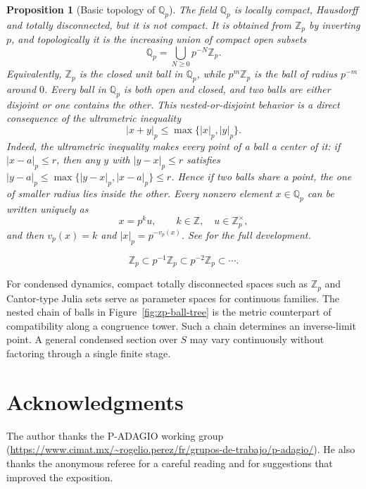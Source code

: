 \documentclass[10pt]{amsart}
\newcommand{\Z}{\mathbb{Z}}
\newcommand{\Zp}{\mathbb{Z}_p}
\newcommand{\Qp}{\mathbb{Q}_p}
\theoremstyle{plain}
\newtheorem{proposition}[theorem]{Proposition}
\theoremstyle{definition}
\begin{document}
\begin{proposition}[Basic topology of $\Qp$]
\label{prop:basic-topology-q-p}
The field $\Qp$ is locally compact, Hausdorff and totally disconnected, but it
is not compact. It is obtained from $\Zp$ by inverting $p$, and topologically it
is the increasing union of compact open subsets
\[
  \Qp=\bigcup_{N\ge0}p^{-N}\Zp.
\]
Equivalently, $\Zp$ is the closed unit ball in $\Qp$, while $p^m\Zp$ is the
ball of radius $p^{-m}$ around $0$. Every ball in $\Qp$ is both open and
closed, and two balls are either disjoint or one contains the other. This
nested-or-disjoint behavior is a direct consequence of the ultrametric
inequality
\[
  |x+y|_p\le \max\{|x|_p,|y|_p\}.
\]
Indeed, the ultrametric inequality makes every point of a ball a center of it:
if $|x-a|_p\le r$, then any $y$ with $|y-x|_p\le r$ satisfies
$|y-a|_p\le\max\{|y-x|_p,|x-a|_p\}\le r$. Hence if two balls share a point, the
one of smaller radius lies inside the other. Every nonzero element $x\in\Qp$
can be written uniquely as
\[
  x=p^k u,\qquad k\in\Z,\quad u\in\Zp^\times,
\]
and then $v_p(x)=k$ and $|x|_p=p^{-v_p(x)}$. See \cite{GouveaPadic} for the
full development.
\end{proposition}

\[
  \Zp\subset p^{-1}\Zp\subset p^{-2}\Zp\subset\cdots.
\]

For condensed dynamics, compact totally disconnected spaces such as $\Zp$ and
Cantor-type Julia sets serve as parameter spaces for continuous families. The
nested chain of balls in Figure~\ref{fig:zp-ball-tree} is the metric counterpart
of compatibility along a congruence tower. Such a chain determines an
inverse-limit point. A general condensed section over $S$ may vary continuously
without factoring through a single finite stage.

\section*{Acknowledgments}

The author thanks the P-ADAGIO working group
(\url{https://www.cimat.mx/~rogelio.perez/fr/grupos-de-trabajo/p-adagio/}).
He also thanks the anonymous referee for a careful reading and for suggestions
that improved the exposition.
\end{document}
